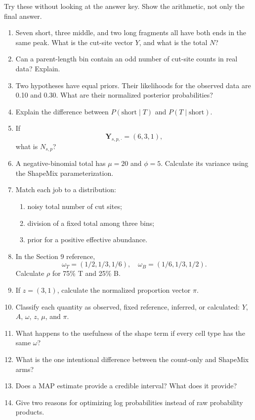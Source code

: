 \documentclass[11pt]{article}
\begin{document}
Try these without looking at the answer key. Show the arithmetic, not only the
final answer.

\begin{enumerate}[leftmargin=2.2em,label=\textbf{\arabic*.}]
  \item Seven short, three middle, and two long fragments all have both ends in
  the same peak. What is the cut-site vector \(Y\), and what is the total \(N\)?

  \item Can a parent-length bin contain an odd number of cut-site counts in real
  data? Explain.

  \item Two hypotheses have equal priors. Their likelihoods for the observed data
  are 0.10 and 0.30. What are their normalized posterior probabilities?

  \item Explain the difference between
  \(P(\text{short}\mid T)\) and \(P(T\mid\text{short})\).

  \item If
  \[
  \boldsymbol{Y}_{s,p,\boldsymbol{\cdot}}=(6,3,1),
  \]
  what is \(N_{s,p}\)?

  \item A negative-binomial total has \(\mu=20\) and \(\phi=5\). Calculate its
  variance using the ShapeMix parameterization.

  \item Match each job to a distribution:
  \begin{enumerate}[label=(\alph*)]
    \item noisy total number of cut sites;
    \item division of a fixed total among three bins;
    \item prior for a positive effective abundance.
  \end{enumerate}

  \item In the Section 9 reference,
  \[
  \omega_T=(1/2,1/3,1/6),\quad
  \omega_B=(1/6,1/3,1/2).
  \]
  Calculate \(\rho\) for 75\% T and 25\% B.

  \item If \(z=(3,1)\), calculate the normalized proportion vector \(\pi\).

  \item Classify each quantity as observed, fixed reference, inferred, or
  calculated: \(Y\), \(A\), \(\omega\), \(z\), \(\mu\), and \(\pi\).

  \item What happens to the usefulness of the shape term if every cell type has
  the same \(\omega\)?

  \item What is the one intentional difference between the count-only and
  ShapeMix arms?

  \item Does a MAP estimate provide a credible interval? What does it provide?

  \item Give two reasons for optimizing log probabilities instead of raw
  probability products.
\end{enumerate}
\end{document}
